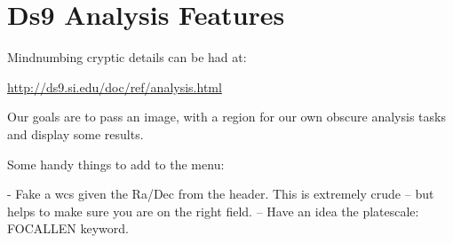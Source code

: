 
\renewcommand{\footerfilename}{ds9analysis.tex}

\section{Ds9 Analysis Features}

Mindnumbing cryptic details can be had at:

\url{http://ds9.si.edu/doc/ref/analysis.html}

Our goals are to pass an image, with a region for our own obscure analysis
tasks and display some results.

Some handy things to add to the  menu:

- Fake a wcs given the Ra/Dec from the header. This is extremely
crude -- but helps to make sure you are on the right field.
-- Have an idea the platescale: FOCALLEN keyword.


